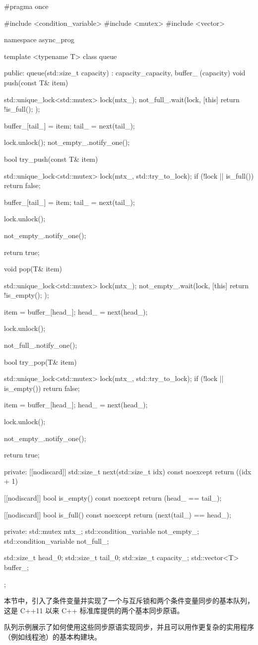 \begin{cpp}
#pragma once

#include <condition_variable>
#include <mutex>
#include <vector>

namespace async_prog {
template <typename T>
class queue {
public:
    queue(std::size_t capacity) : capacity_{capacity}, buffer_
    (capacity) {}
    void push(const T& item) {
        std::unique_lock<std::mutex> lock(mtx_);
        not_full_.wait(lock, [this] { return !is_full(); });

        buffer_[tail_] = item;
        tail_ = next(tail_);

        lock.unlock();
        not_empty_.notify_one();
    }

    bool try_push(const T& item) {
        std::unique_lock<std::mutex> lock(mtx_, std::try_to_lock);
        if (!lock || is_full()) {
            return false;
        }

        buffer_[tail_] = item;
        tail_ = next(tail_);

        lock.unlock();

        not_empty_.notify_one();

        return true;
    }

    void pop(T& item) {
        std::unique_lock<std::mutex> lock(mtx_);
        not_empty_.wait(lock, [this] { return !is_empty(); });

        item = buffer_[head_];
        head_ = next(head_);

        lock.unlock();

        not_full_.notify_one();
    }

    bool try_pop(T& item) {
        std::unique_lock<std::mutex> lock(mtx_, std::try_to_lock);
        if (!lock || is_empty()) {
            return false;
        }

        item = buffer_[head_];
        head_ = next(head_);

        lock.unlock();

        not_empty_.notify_one();

        return true;
    }

private:
    [[nodiscard]] std::size_t next(std::size_t idx) const noexcept {
        return ((idx + 1) %
    }

    [[nodiscard]] bool is_empty() const noexcept { return (head_ ==
    tail_); }

    [[nodiscard]] bool is_full() const noexcept { return (next(tail_)
    == head_); }

private:
    std::mutex mtx_;
    std::condition_variable not_empty_;
    std::condition_variable not_full_;

    std::size_t head_{0};
    std::size_t tail_{0};
    std::size_t capacity_;
    std::vector<T> buffer_;
};
}
\end{cpp}

本节中，引入了条件变量并实现了一个与互斥锁和两个条件变量同步的基本队列，这是 C++11 以来 C++ 标准库提供的两个基本同步原语。

队列示例展示了如何使用这些同步原语实现同步，并且可以用作更复杂的实用程序（例如线程池）的基本构建块。










